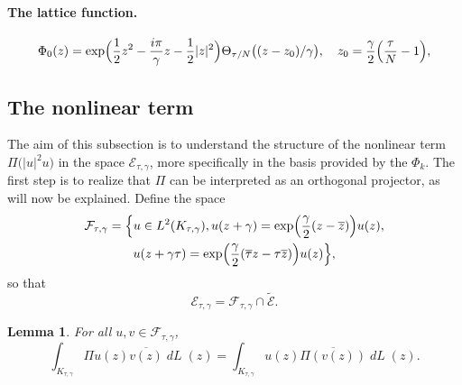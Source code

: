 \documentclass[10pt]{amsart}
\DeclareMathOperator{\dL}{\mathit{dL}}
\newtheorem{lemme}[theorem]{Lemma}
\theoremstyle{definition}
\let\EE\exp
\let\ov\overline
\begin{document}
\paragraph{The lattice function.}
\begin{equation}\label{defPhi0}
\Phi_{0}(z)=\EE\Bigl({\frac{1}{2} z^2 -\frac{i\pi}{\gamma} z - \frac{1}{2} |z|^2} \Bigr) \Theta_{{\tau}/{N}}\bigl((z-z_{0})/{\gamma}\bigr), \quad z_0=\frac{\gamma}2 \Bigl(\frac{\tau}N-1 \Bigr),
\end{equation}
\subsection{The nonlinear term}

The aim of this subsection is to understand the structure of the nonlinear term $\Pi \bigl(|u|^2 u\bigr)$ in the space $\mathcal{E}_{\tau,\gamma}$, more specifically in the basis provided by the $\Phi_k$. The first step is to realize that $\Pi$ can be interpreted as an orthogonal projector, as will now be explained. Define the space\vspace*{-3pt}
\begin{multline*}
\mathcal{F}_{\tau,\gamma}=\Bigl\{u\in L^2 (K_{\tau,\gamma}), u(z+\gamma)=\EE\Bigl({\frac{\gamma}2(z-\ov{z})}\Bigr) u(z),\\
u(z+\gamma\tau) =\EE\Bigl(\frac{\gamma}2(\ov{\tau}z-\tau\ov{z})\Bigr) u(z)\Bigr\},
\end{multline*}
so that\vspace*{-3pt}
\[
\mathcal{E}_{\tau,\gamma} = \mathcal{F}_{\tau,\gamma} \cap \widetilde{\mathcal{E}}.
\]
\begin{lemme}
\label{lemmaproj}
For all $u,v\in \mathcal{F}_{\tau,\gamma}$,\vspace*{-3pt}
\begin{equation*}
\int_{K_{\tau,\gamma}} \Pi u(z) \ov{v(z)}\dL(z)= \int_{K_{\tau,\gamma}} u(z) \ov{\Pi(v(z))}\dL(z).
\end{equation*}
\end{lemme}
\end{document}
